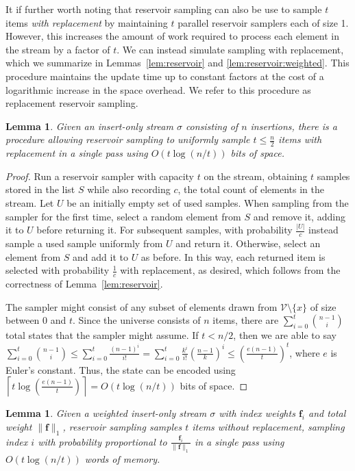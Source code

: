 \documentclass{report}
\newtheorem{lemma}[theorem]{Lemma}
\begin{document}
It if further worth noting that reservoir sampling can also be use to sample $t$ items \emph{with replacement} by maintaining $t$ parallel reservoir samplers each of size 1. 
However, this increases the amount of work required to process each element in the stream by a factor of $t$.
We can instead simulate sampling with replacement, which we summarize in Lemmas~\ref{lem:reservoir} and \ref{lem:reservoir:weighted}.
This procedure maintains the update time up to constant factors at the cost of a logarithmic increase in the space overhead.
We refer to this procedure as replacement reservoir sampling.
%
\begin{lemma} \label{lem:reservoir:replacement}
Given an insert-only stream $\sigma$ consisting of $n$ insertions, there is a procedure allowing reservoir sampling to uniformly sample $t \leq \frac{n}{2}$ items with replacement in a single pass using $O(t\log(n/t))$ bits of space. 
\end{lemma}
%
\begin{proof}
Run a reservoir sampler with capacity $t$ on the stream, obtaining $t$ samples stored in the list $S$ while also recording $c$, the total count of elements in the stream.
Let $U$ be an initially empty set of used samples. 
When sampling from the sampler for the first time, select a random element from $S$ and remove it, adding it to $U$ before returning it.
For subsequent samples, with probability $\frac{|U|}{c}$ instead sample a used sample uniformly from $U$ and return it.
Otherwise, select an element from $S$ and add it to $U$ as before.
In this way, each returned item is selected with probability $\frac{1}{c}$ with replacement, as desired, which follows from the correctness of Lemma~\ref{lem:reservoir}.

The sampler might consist of any subset of elements drawn from $\mathcal{V} \setminus \{x\}$ of size between 0 and $t$. 
Since the universe consists of $n$ items, there are $\sum_{i=0}^t {n-1 \choose i}$ total states that the sampler might assume. 
If $t < n/2$, then we are able to say 
$\sum_{i=0}^t {n-1 \choose i} \leq \sum_{i=0}^t \frac{(n-1)^i}{i!} = \sum_{i=0}^t \frac{k^i}{i!} \left ( \frac{n-1}{k} \right )^i \leq \left ( \frac{e(n-1)}{t} \right )^t$, where $e$ is Euler's constant.
Thus, the state can be encoded using $\left \lceil t \log \left ( \frac{e(n-1)}{t} \right ) \right \rceil = O(t\log(n/t))$ bits of space.
\end{proof}
%
\begin{lemma} \label{lem:reservoir:weighted:replacement}
Given a weighted insert-only stream $\sigma$ with index weights $\mathbf{f}_i$ and total weight $\|\mathbf{f}\|_1$, reservoir sampling samples $t$ items without replacement, sampling index $i$ with probability proportional to $\frac{\mathbf{f}_i}{\|\mathbf{f}\|_1}$ in a single pass using $O(t\log (n/t))$ words of memory. 
\end{lemma}
\end{document}
